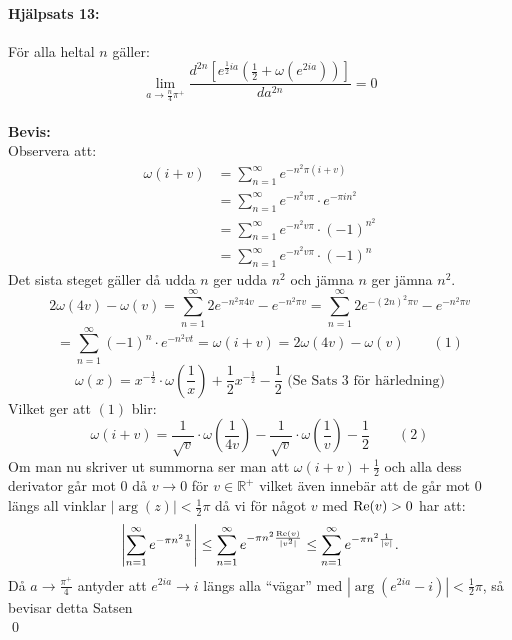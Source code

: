 \documentclass[a4paper]{article}%
\begin{document}
\paragraph{Hjälpsats 13:} För alla heltal $n$ gäller:
\[%
	\lim_{a \to \frac n 4 \pi^+} \frac {
		d^{2n} [
			e^{\frac 1 2 ia} (\frac 1 2 + \omega(e^{2ia}))
		]}
		{
			da^{2n}
		} = 0
\]
\\
{\bf Bevis:}\\
Observera att:
\newcommand{\mysum} {
	\sum_{n = 1}^\infty e^{-n^2 v \pi} \cdot
}
\begin{align*}
	\omega(i + v) &= \sum_{n = 1}^\infty e^{-n^2 \pi(i + v)} \\
		&= \mysum e^{-\pi i n^2} \\
		&= \mysum (- 1)^{n^2} \\
		&= \mysum (- 1)^n
\end{align*}
Det sista steget gäller då udda $n$ ger udda $n^2$ och jämna $n$ ger jämna $n^2$.
\[
	2 \omega(4v) - \omega(v) = \sum_{n = 1}^\infty 2 e^{-n^2 \pi 4 v} - e^{-n^2 \pi v} = \sum_{n = 1}^\infty 2
		e^{-(2n)^2\pi v} - e^{-n^2 \pi v} 
\]
\[
	= \sum_{n = 1}^\infty (-1)^n \cdot e^{-n^2 vt} = \omega(i + v) = 2 \omega(4 v) -
			\omega(v) \qquad (1)
\]
\[
	\omega(x) =  x^{- \frac 1 2} \cdot \omega(\frac 1 x) + \frac 1 2  x^{- \frac 1 2} - \frac 1 2 \text{ (Se Sats 3 för härledning)}
\]
Vilket ger att $(1)$ blir:
\[
	\omega(i + v) = \frac {1} {\sqrt v} \cdot \omega(\frac {1} {4v}) - \frac {1} {\sqrt v} \cdot \omega(\frac 1 v) - \frac 1 2
		\qquad (2)
\]
Om man nu skriver ut summorna ser man att $\omega(i + v) + \frac 1 2$ och alla dess derivator går
mot $0$ då $v \to 0$ för $v \in \mathbb{R}^+$
vilket även innebär att de går mot $0$ längs all vinklar $|\operatorname{arg}(z)| < \frac 1 2 \pi$ då vi för något $v$ med 
$\operatorname{Re}(v) > 0$ har att:
\[
	\left |
		 \sum_{n = 1}^\infty e^{-\pi n^2 \frac 1 v} 
	\right | \leq 
		\sum_{n = 1}^\infty e^{-\pi n^2 \frac {\operatorname{Re}(v)} {|v^2|}}
	\leq
		\sum_{n = 1}^\infty e^{-\pi n^2 \frac {1} {|v|}}.
\]
Då $a \to \frac {\pi^+} {4}$ antyder att $e^{2ia} \to i$ längs alla ``vägar''
med $|\operatorname{arg}(e^{2ia} - i) | < \frac 1 2 \pi$, så bevisar detta Satsen\\
\hfill \qed
\pagebreak
\end{document}
